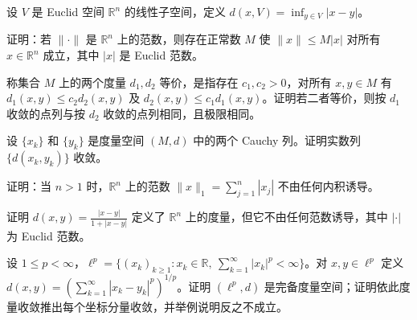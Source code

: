 \noindent\begin{minipage}{\textwidth}
设 $V$ 是 Euclid 空间 $\mathbb R^n$ 的线性子空间，定义 $d(x,V)=\inf_{y\in V}|x-y|$。
\end{minipage}\par\vfill
\noindent\begin{minipage}{\textwidth}
证明：若 $\|\cdot\|$ 是 $\mathbb R^n$ 上的范数，则存在正常数 $M$ 使 $\|x\|\le M|x|$ 对所有 $x\in\mathbb R^n$ 成立，其中 $|x|$ 是 Euclid 范数。
\end{minipage}\par\vfill
\newpage
\noindent\begin{minipage}{\textwidth}
称集合 $M$ 上的两个度量 $d_1,d_2$ 等价，是指存在 $c_1,c_2>0$，对所有 $x,y\in M$ 有 $d_1(x,y)\le c_2d_2(x,y)$ 及 $d_2(x,y)\le c_1d_1(x,y)$。证明若二者等价，则按 $d_1$ 收敛的点列与按 $d_2$ 收敛的点列相同，且极限相同。
\end{minipage}\par\vfill
\noindent\begin{minipage}{\textwidth}
设 $\{x_k\}$ 和 $\{y_k\}$ 是度量空间 $(M,d)$ 中的两个 Cauchy 列。证明实数列 $\{d(x_k,y_k)\}$ 收敛。
\end{minipage}\par\vfill
\noindent\begin{minipage}{\textwidth}
证明：当 $n>1$ 时，$\mathbb R^n$ 上的范数 $\|x\|_1=\sum_{j=1}^n|x_j|$ 不由任何内积诱导。
\end{minipage}\par\vfill
\noindent\begin{minipage}{\textwidth}
证明 $\displaystyle d(x,y)=\frac{|x-y|}{1+|x-y|}$ 定义了 $\mathbb R^n$ 上的度量，但它不由任何范数诱导，其中 $|\cdot|$ 为 Euclid 范数。
\end{minipage}\par\vfill
\newpage
\noindent\begin{minipage}{\textwidth}
设 $1\le p<\infty$，$\displaystyle\ell^p=\{(x_k)_{k\ge1}:x_k\in\mathbb R,\ \sum_{k=1}^{\infty}|x_k|^p<\infty\}$。对 $x,y\in\ell^p$ 定义 $\displaystyle d(x,y)=(\sum_{k=1}^{\infty}|x_k-y_k|^p)^{1/p}$。证明 $(\ell^p,d)$ 是完备度量空间；证明依此度量收敛推出每个坐标分量收敛，并举例说明反之不成立。
\end{minipage}\par\vfill
